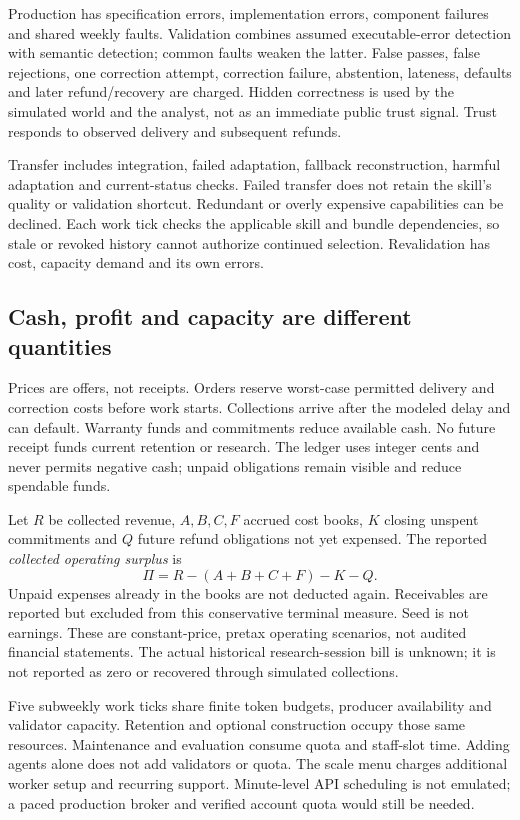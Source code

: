 \documentclass[11pt,letterpaper]{article}
\begin{document}
Production has specification errors, implementation errors, component failures
and shared weekly faults. Validation combines assumed executable-error detection
with semantic detection; common faults weaken the latter. False passes, false
rejections, one correction attempt, correction failure, abstention, lateness,
defaults and later refund/recovery are charged. Hidden correctness is used by the
simulated world and the analyst, not as an immediate public trust signal.
Trust responds to observed delivery and subsequent refunds.

Transfer includes integration, failed adaptation, fallback reconstruction,
harmful adaptation and current-status checks. Failed transfer does not retain
the skill's quality or validation shortcut. Redundant or overly expensive
capabilities can be declined. Each work tick checks the applicable skill and
bundle dependencies, so stale or revoked history cannot authorize continued
selection. Revalidation has cost, capacity demand and its own errors.

\subsection{Cash, profit and capacity are different quantities}

Prices are offers, not receipts. Orders reserve worst-case permitted delivery
and correction costs before work starts. Collections arrive after the modeled
delay and can default. Warranty funds and commitments reduce available cash.
No future receipt funds current retention or research. The ledger uses integer
cents and never permits negative cash; unpaid obligations remain visible and
reduce spendable funds.

Let $R$ be collected revenue, $A,B,C,F$ accrued cost books, $K$ closing unspent
commitments and $Q$ future refund obligations not yet expensed. The reported
\emph{collected operating surplus} is
\begin{equation}
\Pi=R-(A+B+C+F)-K-Q.
\end{equation}
Unpaid expenses already in the books are not deducted again. Receivables are
reported but excluded from this conservative terminal measure. Seed is not
earnings. These are constant-price, pretax operating scenarios, not audited
financial statements. The actual historical research-session bill is unknown;
it is not reported as zero or recovered through simulated collections.

Five subweekly work ticks share finite token budgets, producer availability and
validator capacity. Retention and optional construction occupy those same
resources. Maintenance and evaluation consume quota and staff-slot time.
Adding agents alone does not add validators or quota. The scale menu charges
additional worker setup and recurring support. Minute-level API scheduling is
not emulated; a paced production broker and verified account quota would still
be needed.
\end{document}
